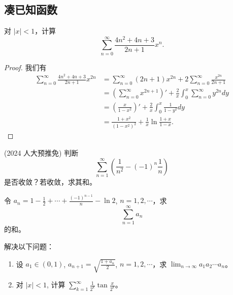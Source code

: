 \documentclass[lang=cn,10pt,thmcnt=section]{elegantbook}
\begin{document}
\subsection{凑已知函数}
\begin{example}
	对 $|x| < 1$，计算
\[
\sum_{n=0}^{\infty} \frac{4n^2 + 4n + 3}{2n+1}x^n.
\]
\end{example}
\begin{proof}
	我们有
\begin{align*}
    \sum_{n=0}^\infty \frac{4n^2+4n+3}{2n+1}x^{2n} &= \sum_{n=0}^\infty (2n+1)x^{2n} + 2\sum_{n=0}^\infty \frac{x^{2n}}{2n+1} \\
    &= \left(\sum_{n=0}^\infty x^{2n+1}\right)' + \frac{2}{x}\int_0^x \sum_{n=0}^\infty y^{2n} dy \\
    &= \left(\frac{x}{1-x^2}\right)' + \frac{2}{x}\int_0^x \frac{1}{1-y^2} dy \\
    &= \frac{1+x^2}{(1-x^2)^2} + \frac{1}{x} \ln\frac{1+x}{1-x}.
\end{align*}
\end{proof}
\begin{example}
	(2024 人大预推免) 判断
\[
\sum_{n=1}^{\infty} \left( \frac{1}{n^2} - (-1)^n \frac{1}{n} \right)
\]
是否收敛？若收敛，求其和。
\end{example}
\begin{example}
	令 $a_n = 1 - \frac{1}{2} + \cdots + \frac{(-1)^{n-1}}{n} - \ln 2$, $n = 1, 2, \cdots$，求
\[
\sum_{n=1}^{\infty} a_n
\]
的和。
\end{example}
\begin{example}
	解决以下问题：
\begin{enumerate}
    \item 设 $a_1 \in (0, 1)$, $a_{n+1} = \sqrt{\frac{1 + a_n}{2}}$, $n = 1, 2, \cdots$，求 $\lim_{n \to \infty} a_1 a_2 \cdots a_n$。
    \item 对 $|x| < 1$, 计算 $\sum_{k=1}^{\infty} \frac{1}{2^k} \tan \frac{x}{2^k}$。
\end{enumerate}
\end{example}
\end{document}

